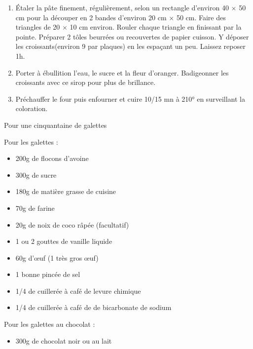 {\begin{enumerate}
	\item Étaler la pâte finement, régulièrement, selon un rectangle d'environ 40 $\times$ 50 cm pour la découper en 2 bandes d'environ 20 cm $\times$ 50 cm. Faire des triangles de 20 $\times$ 10 cm environ. Rouler chaque triangle en finissant par la pointe. Préparer 2 tôles beurrées ou recouvertes de papier cuisson. Y déposer les croissants(environ 9 par plaques) en les espaçant un peu. Laissez reposer 1h.
	\item Porter à ébullition l'eau, le sucre et la fleur d'oranger. Badigeonner les croissants avec ce sirop pour plus de brillance.
	\item Préchauffer le four puis enfourner et cuire 10/15 mn à 210° en surveillant la coloration. 
\end{enumerate}}

{Pour une cinquantaine de galettes}{Pour les galettes :
\begin{itemize}
\item 200g de flocons d'avoine
\item 300g de sucre
\item 180g de matière grasse de cuisine
\item 70g de farine
\item 20g de noix de coco râpée (facultatif)
\item 1 ou 2 gouttes de vanille liquide
\item 60g d'\oe uf (1 très gros \oe uf)
\item 1 bonne pincée de sel
\item 1/4 de cuillerée à café de levure chimique
\item 1/4 de cuillerée à café de de bicarbonate de sodium
\end{itemize}
Pour les galettes au chocolat :
\begin{itemize}
\item 300g de chocolat noir ou au lait
\end{itemize}}
